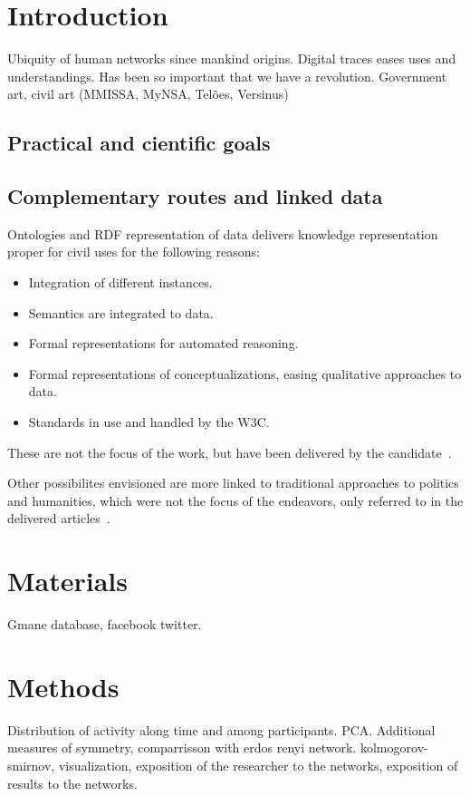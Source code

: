 \documentclass{article}
\begin{document}
        
    \section{Introduction}
    Ubiquity of human networks since mankind origins.
    Digital traces eases uses and understandings.
    Has been so important that we have a revolution.
    Government art, civil art (MMISSA, MyNSA, Telões, Versinus)
    \subsection{Practical and cientific goals}
    \subsection{Complementary routes and linked data}
    Ontologies and RDF representation of data delivers knowledge representation
    proper for civil uses for the following reasons:
    \begin{itemize}
	\item Integration of different instances.
	\item Semantics are integrated to data.
	\item Formal representations for automated reasoning.
	\item Formal representations of conceptualizations, easing qualitative approaches to data.
	\item Standards in use and handled by the W3C.
    \end{itemize}

    These are not the focus of the work, but have been delivered by the candidate~\cite{OPS,OPa,OCD,Ontologiaa,OBS,VBS}.

    Other possibilites envisioned are more linked to traditional approaches to politics and humanities, which were not the focus of the endeavors, only referred to in the delivered articles~\cite{stability,differentiation,versinus,ops}.

    \section{Materials}
    Gmane database, facebook twitter.
    \section{Methods}
    Distribution of activity along time and among participants.
    PCA. Additional measures of symmetry, comparrisson with erdos renyi network. kolmogorov-smirnov, visualization, exposition of the researcher to the networks, exposition of results to the networks.
\end{document}

